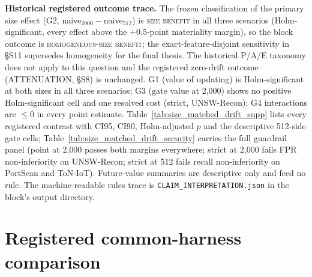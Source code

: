 \documentclass[a4paper,11pt]{article}
\begin{document}
\textbf{Historical registered outcome trace.} The frozen classification of the primary size effect
(G2, naive$_{2000}-$naive$_{512}$) is \textsc{size benefit} in all three scenarios
(Holm-significant, every effect above the $+0.5$-point materiality margin), so the
block outcome is \textsc{homogeneous-size benefit}; the exact-feature-disjoint sensitivity
in \S S11 supersedes homogeneity for the final thesis. The historical P/A/E taxonomy does
not apply to this question and the registered zero-drift outcome (ATTENUATION, \S S8) is
unchanged. G1 (value of updating) is Holm-significant at both sizes in all three
scenarios; G3 (gate value at 2{,}000) shows no positive Holm-significant cell and one
resolved cost (strict, UNSW-Recon); G4 interactions are $\le 0$ in every point estimate.
Table~\ref{tab:size_matched_drift_supp} lists every registered contrast with CI95, CI90,
Holm-adjusted $p$ and the descriptive 512-side gate cells; Table~\ref{tab:size_matched_drift_security}
carries the full guardrail panel (point at 2{,}000 passes both margins everywhere; strict
at 2{,}000 fails FPR non-inferiority on UNSW-Recon; strict at 512 fails recall
non-inferiority on PortScan and ToN-IoT). Future-value summaries are descriptive only and
feed no rule. The machine-readable rules trace is \texttt{CLAIM\_INTERPRETATION.json} in
the block's output directory.




\section{Registered common-harness comparison}
\label{sec:supp_common_harness}
\end{document}
